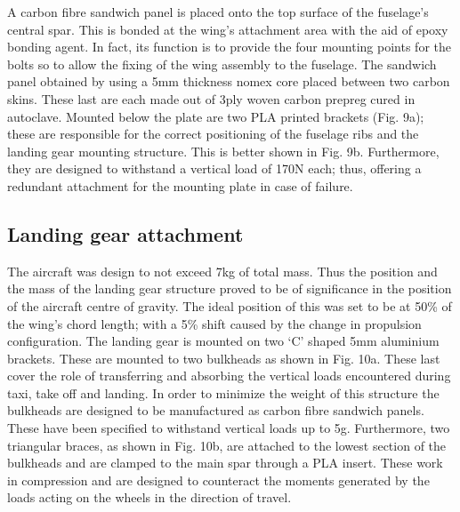 \documentclass[../../main.tex]{subfiles}
\begin{document}
A carbon fibre sandwich panel is placed onto the top surface of the fuselage’s central spar.
This is bonded at the wing’s attachment area with the aid of epoxy bonding agent.
In fact, its function is to provide the four mounting points for the bolts so to allow the fixing of the wing assembly to the fuselage.
The sandwich panel obtained by using a 5mm thickness nomex core placed between two carbon skins.
These last are each made out of 3ply woven carbon prepreg cured in autoclave.
Mounted below the plate are two PLA printed brackets (Fig. 9a); these are responsible for the correct positioning of the fuselage ribs and the landing gear mounting structure.
This is better shown in Fig. 9b.
Furthermore, they are designed to withstand a vertical load of 170N each; thus, offering a redundant attachment for the mounting plate in case of failure.


\subsection{Landing gear attachment} \label{sec:final-design-proposal:fuselage:landing-gear-attachment}

The aircraft was design to not exceed 7kg of total mass.
Thus the position and the mass of the landing gear structure proved to be of significance in the position of the aircraft centre of gravity.
The ideal position of this was set to be at 50\% of the wing’s chord length; with a 5\% shift caused by the change in propulsion configuration.
The landing gear is mounted on two ‘C’ shaped 5mm aluminium brackets.
These are mounted to two bulkheads as shown in Fig. 10a.
These last cover the role of transferring and absorbing the vertical loads encountered during taxi, take off and landing.
In order to minimize the weight of this structure the bulkheads are designed to be manufactured as carbon fibre sandwich panels.
These have been specified to withstand vertical loads up to 5g.
Furthermore, two triangular braces, as shown in Fig. 10b, are attached to the lowest section of the bulkheads and are clamped to the main spar through a PLA insert.
These work in compression and are designed to counteract the moments generated by the loads acting on the wheels in the direction of travel. 

\end{document}
